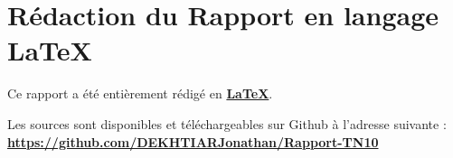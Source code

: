 \documentclass[12pt,a4paper,utf8x, combine]{report}
\begin{document}


\printindex

\appendix

\pagebreak

\chapter*{Rédaction du Rapport en langage LaTeX}
Ce rapport a été entièrement rédigé en \href{http://fr.wikipedia.org/wiki/LaTeX}{\textbf{LaTeX}}. 

Les sources sont disponibles et téléchargeables sur Github à l'adresse suivante :\\
\textbf{\url{https://github.com/DEKHTIARJonathan/Rapport-TN10}}
\end{document}
